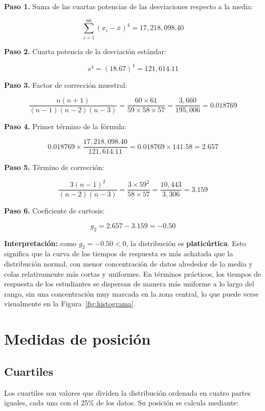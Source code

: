 \documentclass[12pt,letterpaper]{article}
\begin{document}
\textbf{Paso 1.} Suma de las cuartas potencias de las desviaciones respecto a la media:

\[
\sum_{i=1}^{60}(x_i-\bar{x})^4 = 17{,}218{,}098.40
\]

\textbf{Paso 2.} Cuarta potencia de la desviación estándar:

\[
s^4 = (18.67)^4 = 121{,}614.11
\]

\textbf{Paso 3.} Factor de corrección muestral:

\[
\frac{n(n+1)}{(n-1)(n-2)(n-3)}
= \frac{60 \times 61}{59 \times 58 \times 57}
= \frac{3{,}660}{195{,}006}
= 0.018769
\]

\textbf{Paso 4.} Primer término de la fórmula:

\[
0.018769 \times \frac{17{,}218{,}098.40}{121{,}614.11}
= 0.018769 \times 141.58
= 2.657
\]

\textbf{Paso 5.} Término de corrección:

\[
\frac{3(n-1)^2}{(n-2)(n-3)}
= \frac{3 \times 59^2}{58 \times 57}
= \frac{10{,}443}{3{,}306}
= 3.159
\]

\textbf{Paso 6.} Coeficiente de curtosis:

\[
\boxed{g_2 = 2.657 - 3.159 = -0.50}
\]

\textbf{Interpretación:} como $g_2 = -0.50 < 0$, la distribución es \textbf{platicúrtica}. Esto significa que la curva de los tiempos de respuesta es más achatada que la distribución normal, con menor concentración de datos alrededor de la media y colas relativamente más cortas y uniformes. En términos prácticos, los tiempos de respuesta de los estudiantes se dispersan de manera más uniforme a lo largo del rango, sin una concentración muy marcada en la zona central, lo que puede verse visualmente en la Figura~\ref{fig:histograma}.

\section{Medidas de posición}
\label{sec:posicion}

\subsection{Cuartiles}

Los cuartiles son valores que dividen la distribución ordenada en cuatro partes iguales, cada una con el 25\% de los datos. Su posición se calcula mediante:
\end{document}

